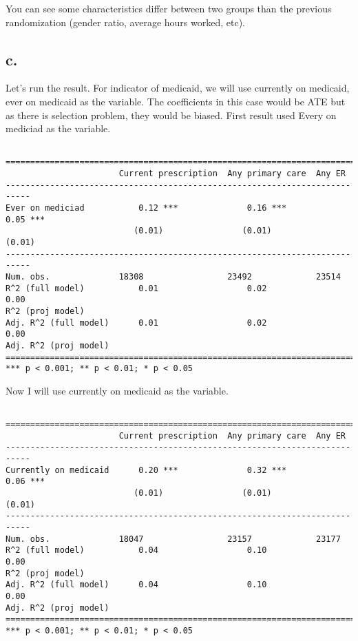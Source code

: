 \documentclass[
  letterpaper,
  DIV=11,
  numbers=noendperiod]{scrartcl}
\begin{document}
You can see some characteristics differ between two groups than the
previous randomization (gender ratio, average hours worked, etc).

\subsection{c.}\label{c.-1}

Let's run the result. For indicator of medicaid, we will use currently
on medicaid, ever on medicaid as the variable. The coefficients in this
case would be ATE but as there is selection problem, they would be
biased. First result used Every on mediciad as the variable.

\begin{verbatim}

===========================================================================
                       Current prescription  Any primary care  Any ER      
---------------------------------------------------------------------------
Ever on mediciad           0.12 ***              0.16 ***          0.05 ***
                          (0.01)                (0.01)            (0.01)   
---------------------------------------------------------------------------
Num. obs.              18308                 23492             23514       
R^2 (full model)           0.01                  0.02              0.00    
R^2 (proj model)                                                           
Adj. R^2 (full model)      0.01                  0.02              0.00    
Adj. R^2 (proj model)                                                      
===========================================================================
*** p < 0.001; ** p < 0.01; * p < 0.05
\end{verbatim}

Now I will use currently on medicaid as the variable.

\begin{verbatim}

===========================================================================
                       Current prescription  Any primary care  Any ER      
---------------------------------------------------------------------------
Currently on medicaid      0.20 ***              0.32 ***          0.06 ***
                          (0.01)                (0.01)            (0.01)   
---------------------------------------------------------------------------
Num. obs.              18047                 23157             23177       
R^2 (full model)           0.04                  0.10              0.00    
R^2 (proj model)                                                           
Adj. R^2 (full model)      0.04                  0.10              0.00    
Adj. R^2 (proj model)                                                      
===========================================================================
*** p < 0.001; ** p < 0.01; * p < 0.05
\end{verbatim}
\end{document}
